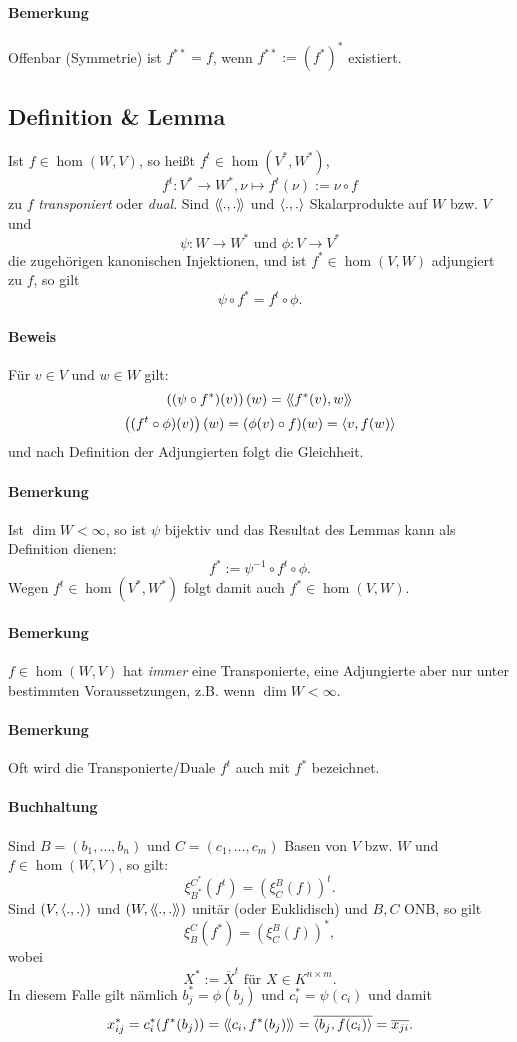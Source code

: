 \paragraph{Bemerkung}
	Offenbar (Symmetrie) ist $ f^{**} = f $, wenn $ f^{**} := (f^*)^* $ existiert.

\subsection{Definition \& Lemma}
\begin{Definition}
	Ist $ f\in \hom(W,V) $, so heißt $ f^t\in \hom(V^*,W^*) $,
		\[ f^t:V^*\to W^*,\nu\mapsto f^t(\nu):= \nu\circ f \]
	zu $ f $ \emph{transponiert} oder \emph{dual}. Sind $ \langle\! \langle .,. \rangle\! \rangle $ und $ \langle .,. \rangle $ Skalarprodukte auf $ W $ bzw. $ V $ und
		\[ \psi:W\to W^*\text{ und }\phi:V\to V^* \]
	die zugehörigen kanonischen Injektionen, und ist $ f^*\in \hom(V,W) $ adjungiert zu $ f $, so gilt
		\[ \psi \circ f^* = f^t\circ \phi. \]
\end{Definition}
\paragraph{Beweis}
	Für $ v\in V $ und $ w\in W $ gilt:
		\[ \left((\psi\circ f^*)(v)\right)(w) = \langle\! \langle f^*(v),w \rangle\! \rangle \]
		\[ \left((f^t\circ \phi)(v)\right)(w) = (\phi(v)\circ f)(w) = \langle v,f(w) \rangle \]
	und nach Definition der Adjungierten folgt die Gleichheit.
\paragraph{Bemerkung}
	Ist $ \dim W<\infty $, so ist $ \psi $ bijektiv und das Resultat des Lemmas kann als Definition dienen:
		\[ f^* := \psi^{-1}\circ f^t\circ \phi. \]
	Wegen $ f^t\in \hom(V^*,W^*) $ folgt damit auch $ f^*\in \hom(V,W) $.
\paragraph{Bemerkung}
	$ f\in \hom(W,V) $ hat \emph{immer} eine Transponierte, eine Adjungierte aber nur unter bestimmten Voraussetzungen, z.B. wenn $ \dim W < \infty $.
\paragraph{Bemerkung}
	Oft wird die Transponierte/Duale $ f^t $ auch mit $ f^* $ bezeichnet.
\paragraph{Buchhaltung}
	Sind $ B=(b_1,\dots,b_n) $ und $ C=(c_1,\dots,c_m) $ Basen von $ V $ bzw. $ W $ und $ f\in \hom(W,V) $, so gilt:
		\[ \xi_{B^*}^{C^*}(f^t) = \left(\xi_C^B(f)\right)^t. \]
	Sind $ (V,\langle .,. \rangle) $ und $ (W,\langle\! \langle .,. \rangle\! \rangle) $ unitär (oder Euklidisch) und $ B, C $ ONB, so gilt
		\[ \xi_B^C(f^*) = \left(\xi_C^B(f)\right)^*, \]
	wobei 
		\[ X^*:= \overline{X}^t \text{ für } X\in K^{n\times m}. \]
	In diesem Falle gilt nämlich $ b_j^*=\phi(b_j) $ und $ c_i^* = \psi(c_i) $ und damit
		\[ x_{ij}^* = c_i^*(f^*(b_j)) = \langle\! \langle c_i,f^*(b_j) \rangle\! \rangle = \overline{\langle b_j,f(c_i) \rangle} = \overline{x_{ji}}. \]

